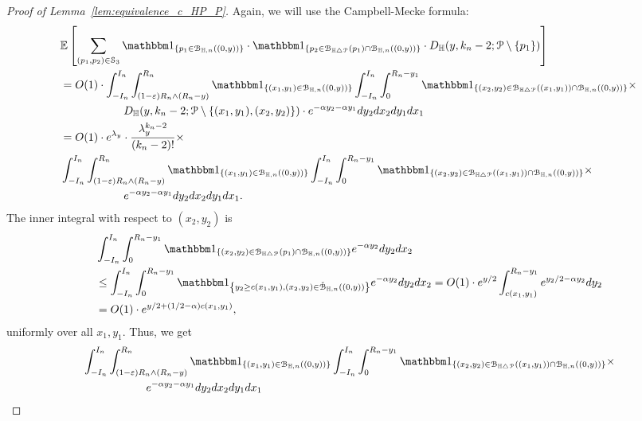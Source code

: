 \begin{proof}[Proof of Lemma~\ref{lem:equivalence_c_HP_P}]
Again, we will use the Campbell-Mecke formula: 
\begin{equation*}
\begin{split} 
&\Exp { \sum_{(p_1,p_2)  \in \mathcal{S}_3} 
\ind{p_1 \in \BallHyp{(0,y)}} \cdot \ind{p_2 \in \BallSym{p_1} \cap \BallHyp{(0,y)}}
\cdot D_\H (y,k_n-2;\Pcal \setminus \{ p_1\})} \\
& =O(1) \cdot \int_{-I_n}^{I_n} \int_{(1-\eps) R_n \wedge (R_n-y)}^{R_n} \ind{(x_1,y_1) \in \BallHyp{(0,y)}}
\int_{-I_n}^{I_n} \int_{0}^{R_n-y_1} 
\ind{(x_2,y_2) \in \BallSym{(x_1,y_1)} \cap \BallHyp{(0,y)}} \times \\ 
& \hspace{2cm}  D_\H (y,k_n-2;\Pcal \setminus \{ (x_1,y_1), (x_2,y_2)\}) \cdot
e^{-\alpha y_2 - \alpha y_1} dy_2 dx_2 dy_1 dx_1 \\
& =O(1) \cdot 
e^{\lambda_y} \cdot \frac{\lambda_y^{k_n-2}}{(k_n-2)!}\times \\
& \int_{-I_n}^{I_n} \int_{(1-\eps) R_n \wedge (R_n-y)}^{R_n} \ind{(x_1,y_1) \in \BallHyp{(0,y)}}
\int_{-I_n}^{I_n} \int_{0}^{R_n-y_1} 
\ind{(x_2,y_2) \in \BallSym{(x_1,y_1)} \cap \BallHyp{(0,y)}} \times \\ 
& \hspace{2cm}  e^{-\alpha y_2 - \alpha y_1} dy_2 dx_2 dy_1 dx_1.
\end{split}
\end{equation*}
The inner integral with respect to $(x_2,y_2)$ is 
\begin{equation*}
\begin{split}
&\int_{-I_n}^{I_n} \int_{0}^{R_n - y_1}  \ind{(x_2,y_2) \in \BallSym{p_1}\cap \BallHyp{(0,y)}}  
e^{-\alpha y_2} dy_2 dx_2\\
&  \leq 
\int_{-I_n}^{I_n} \int_{0}^{R_n-y_1}  \ind{y_2 \geq c(x_1,y_1), (x_2,y_2) \in \FatBallHyp{(0,y)}}  
e^{-\alpha y_2} dy_2 dx_2 
=
O(1) \cdot e^{y/2} \int_{c(x_1,y_1)}^{R_n - y_1} e^{y_2/2 - \alpha y_2} dy_2 \\
&=O(1) \cdot e^{y/2 + (1/2 -\alpha) c(x_1,y_1)},
\end{split}
\end{equation*}
uniformly over all $x_1,y_1$. 
Thus, we get
\begin{equation*}
\begin{split}
 &\int_{-I_n}^{I_n} \int_{(1-\eps) R_n \wedge (R_n-y)}^{R_n} \ind{(x_1,y_1) \in \BallHyp{(0,y)}}
\int_{-I_n}^{I_n} \int_{0}^{R_n-y_1} 
\ind{(x_2,y_2) \in \BallSym{(x_1,y_1)} \cap \BallHyp{(0,y)}} \times \\ 
& \hspace{2cm}  e^{-\alpha y_2 - \alpha y_1} dy_2 dx_2 dy_1 dx_1 \\

\end{split}
\end{equation*}
\end{proof}
